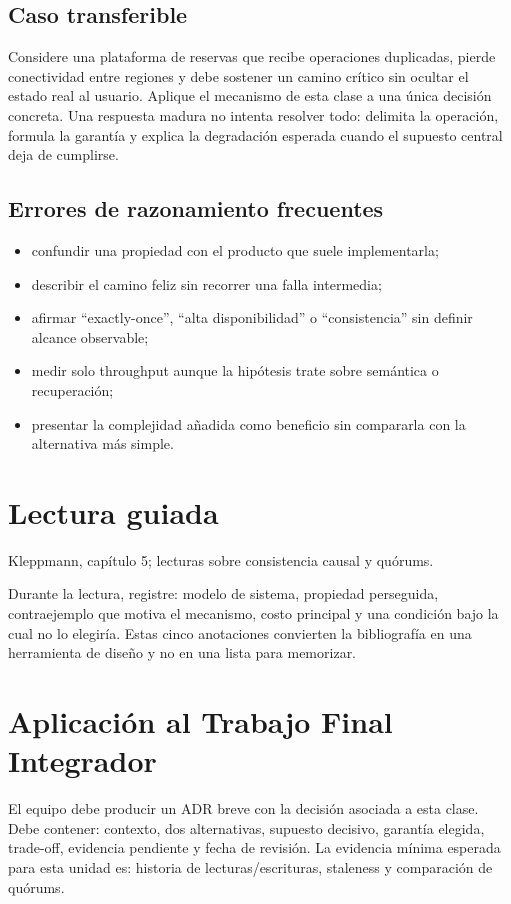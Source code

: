 \documentclass[variant=apuntes,cover=institutional,mode=screen]{ua-engineering-v6-article}
\begin{document}
\subsection{Caso transferible}
Considere una plataforma de reservas que recibe operaciones duplicadas, pierde conectividad entre regiones y debe sostener un camino crítico sin ocultar el estado real al usuario. Aplique el mecanismo de esta clase a una única decisión concreta. Una respuesta madura no intenta resolver todo: delimita la operación, formula la garantía y explica la degradación esperada cuando el supuesto central deja de cumplirse.

\subsection{Errores de razonamiento frecuentes}
\begin{itemize}
\item confundir una propiedad con el producto que suele implementarla;
\item describir el camino feliz sin recorrer una falla intermedia;
\item afirmar ``exactly-once'', ``alta disponibilidad'' o ``consistencia'' sin definir alcance observable;
\item medir solo throughput aunque la hipótesis trate sobre semántica o recuperación;
\item presentar la complejidad añadida como beneficio sin compararla con la alternativa más simple.
\end{itemize}

\section{Lectura guiada}
Kleppmann, capítulo 5; lecturas sobre consistencia causal y quórums.

Durante la lectura, registre: modelo de sistema, propiedad perseguida, contraejemplo que motiva el mecanismo, costo principal y una condición bajo la cual no lo elegiría. Estas cinco anotaciones convierten la bibliografía en una herramienta de diseño y no en una lista para memorizar.

\section{Aplicación al Trabajo Final Integrador}
El equipo debe producir un ADR breve con la decisión asociada a esta clase. Debe contener: contexto, dos alternativas, supuesto decisivo, garantía elegida, trade-off, evidencia pendiente y fecha de revisión. La evidencia mínima esperada para esta unidad es: historia de lecturas/escrituras, staleness y comparación de quórums.
\end{document}
